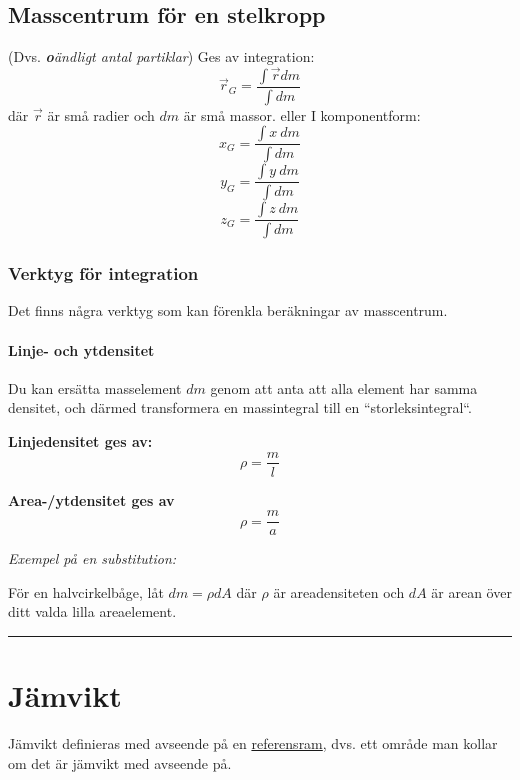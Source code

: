 \documentclass{article}
\newenvironment{ankiflashcard}[1]{}{}
\newcommand{\ruler}{
\rule{0.5\textwidth}{0.5pt}
}
\begin{document}
\begin{paracol}{2}
\begin{ankiflashcard}{Hur kan man bestämma masscentrum för ett partikelsystem?}
\end{ankiflashcard}

\begin{ankiflashcard}{Hur kan man bestämma masscentrum för en stelkropp?}
    
\subsection{Masscentrum för en stelkropp}
(Dvs. \textit{\textbf{o}ändligt antal partiklar})
Ges av integration:
$$
\vec r_G = \frac{\int \vec r dm}{\int dm}
$$
där $\vec r$ är små radier och $dm$ är små massor.
eller I komponentform:
$$x_G = \frac{\int x\ dm}{\int dm}$$
$$y_G = \frac{\int y\ dm}{\int dm}$$
$$z_G = \frac{\int z\  dm}{\int dm}$$
\end{ankiflashcard}
\subsubsection{Verktyg för integration}
Det finns några verktyg som kan förenkla beräkningar av masscentrum.

    
\paragraph{Linje- och ytdensitet}


Du kan ersätta masselement $dm$ genom att anta att alla element har samma densitet, och därmed transformera en massintegral till en ``storleksintegral``.


\begin{ankiflashcard}{Ange formeln för linjedensitet.}

\textbf{Linjedensitet ges av:}
$$
\rho = \frac{m}{l}
$$
\end{ankiflashcard}


\begin{ankiflashcard}{Ange formeln för area-/ytdensitet.}
    
\textbf{Area-/ytdensitet ges av}
$$
\rho = \frac{m}{a}
$$

\textit{Exempel på en substitution:}

För en halvcirkelbåge, låt $dm=\rho dA$ där $\rho$ är areadensiteten och $dA$ är arean över ditt valda lilla areaelement.
\end{ankiflashcard}

\ruler
\section{Jämvikt}
Jämvikt definieras med avseende på en \underline{referensram}, dvs. ett område man kollar om det är jämvikt med avseende på.


\end{paracol}
\end{document}
